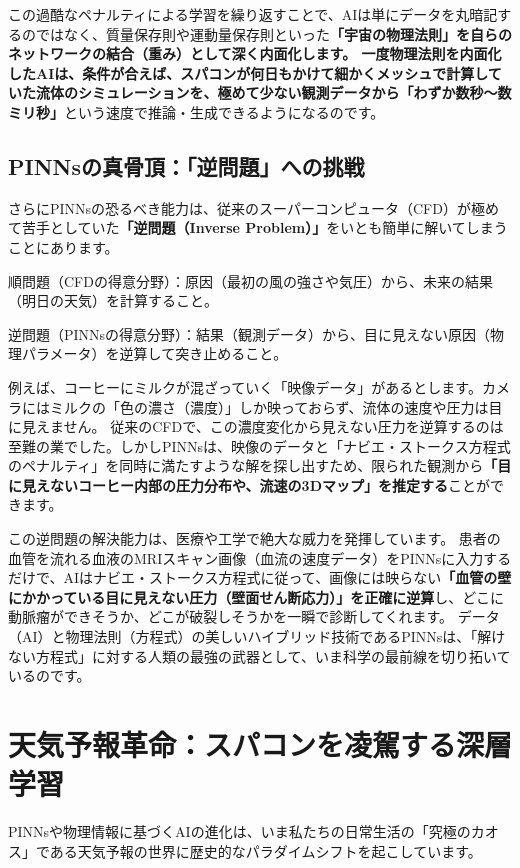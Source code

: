 この過酷なペナルティによる学習を繰り返すことで、AIは単にデータを丸暗記するのではなく、質量保存則や運動量保存則といった\textbf{「宇宙の物理法則」を自らのネットワークの結合（重み）として深く内面化します。 一度物理法則を内面化したAIは、条件が合えば、スパコンが何日もかけて細かくメッシュで計算していた流体のシミュレーションを、極めて少ない観測データから「わずか数秒〜数ミリ秒」}という速度で推論・生成できるようになるのです。

\subsection{PINNsの真骨頂：「逆問題」への挑戦}

さらにPINNsの恐るべき能力は、従来のスーパーコンピュータ（CFD）が極めて苦手としていた\textbf{「逆問題（Inverse Problem）」}をいとも簡単に解いてしまうことにあります。

順問題（CFDの得意分野）：原因（最初の風の強さや気圧）から、未来の結果（明日の天気）を計算すること。

逆問題（PINNsの得意分野）：結果（観測データ）から、目に見えない原因（物理パラメータ）を逆算して突き止めること。

例えば、コーヒーにミルクが混ざっていく「映像データ」があるとします。カメラにはミルクの「色の濃さ（濃度）」しか映っておらず、流体の速度や圧力は目に見えません。 従来のCFDで、この濃度変化から見えない圧力を逆算するのは至難の業でした。しかしPINNsは、映像のデータと「ナビエ・ストークス方程式のペナルティ」を同時に満たすような解を探し出すため、限られた観測から\textbf{「目に見えないコーヒー内部の圧力分布や、流速の3Dマップ」を推定する}ことができます。

この逆問題の解決能力は、医療や工学で絶大な威力を発揮しています。 患者の血管を流れる血液のMRIスキャン画像（血流の速度データ）をPINNsに入力するだけで、AIはナビエ・ストークス方程式に従って、画像には映らない\textbf{「血管の壁にかかっている目に見えない圧力（壁面せん断応力）」を正確に逆算}し、どこに動脈瘤ができそうか、どこが破裂しそうかを一瞬で診断してくれます。 データ（AI）と物理法則（方程式）の美しいハイブリッド技術であるPINNsは、「解けない方程式」に対する人類の最強の武器として、いま科学の最前線を切り拓いているのです。

\section{天気予報革命：スパコンを凌駕する深層学習}

PINNsや物理情報に基づくAIの進化は、いま私たちの日常生活の「究極のカオス」である天気予報の世界に歴史的なパラダイムシフトを起こしています。

